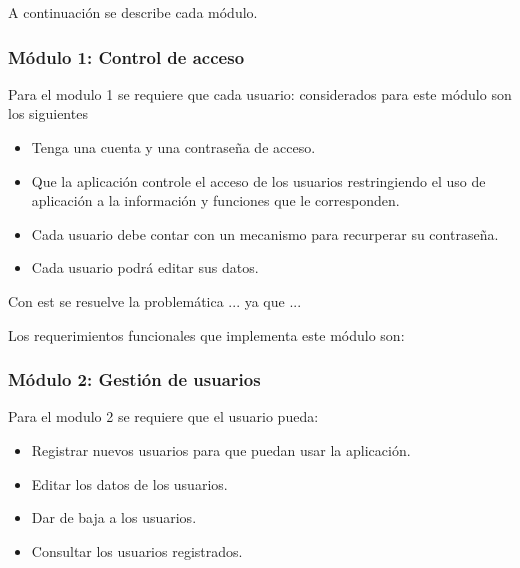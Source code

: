 A continuación se describe cada módulo.

\subsubsection{Módulo 1: Control de acceso}
Para el modulo 1 se requiere que cada usuario: considerados para este módulo son los siguientes
\begin{itemize}
	\item Tenga una cuenta y una contraseña de acceso.
	\item Que la aplicación controle el acceso de los usuarios restringiendo el uso de aplicación a la información y funciones que le corresponden.
	\item Cada usuario debe contar con un mecanismo para recurperar su contraseña.
	\item Cada usuario podrá editar sus datos.
\end{itemize} 

Con est se resuelve la problemática ... ya que ... 

Los requerimientos funcionales que implementa este módulo son:




\subsubsection{Módulo 2: Gestión de usuarios}
Para el modulo 2 se requiere que el usuario pueda:\\

\begin{itemize}
	\item Registrar nuevos usuarios para que puedan usar la aplicación.
	\item Editar los datos de los usuarios.
	\item Dar de baja a los usuarios.
	\item Consultar los usuarios registrados.
\end{itemize}

